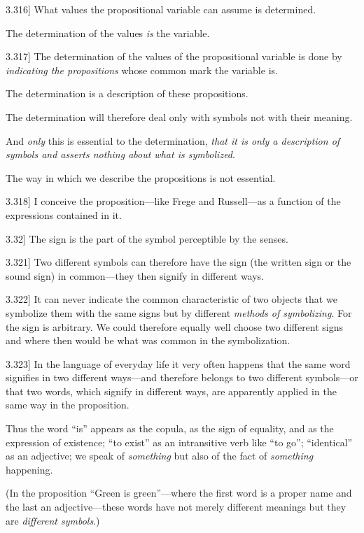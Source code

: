 \documentclass[12pt,oneside]{book}[2007/10/19]
\newcommand{\PropositionE}[2]{%
  \item[\phantomsection\label{PropE:#1}\PropGRef{#1}] #2%
}
\newcommand{\PropGRef}[1]{\hyperref[PropG:#1]{#1}}
\begin{document}
\begin{propositions}
\PropositionE{3.316}
{What values the propositional variable can
assume is determined.

The determination of the values \emph{is} the variable.}


\PropositionE{3.317}
{The determination of the values of the propositional
variable is done by \emph{indicating the propositions}
whose common mark the variable is.

The determination is a description of these
propositions.

The determination will therefore deal only with
symbols not with their meaning.

And \emph{only} this is essential to the determination,
\emph{that it is only a description of symbols and asserts
nothing about what is symbolized}.

The way in which we describe the propositions
is not essential.}


\PropositionE{3.318}
{I conceive the proposition---like Frege and
Russell---as a function of the expressions contained
in it.}


\PropositionE{3.32}
{The sign is the part of the symbol perceptible
by the senses.}


\PropositionE{3.321}
{Two different symbols can therefore have the
sign (the written sign or the sound sign) in
common---they then signify in different ways.}


\PropositionE{3.322}
{It can never indicate the common characteristic
of two objects that we symbolize them with the
same signs but by different \emph{methods of symbolizing}.
For the sign is arbitrary. We could therefore
equally well choose two different signs and
where then would be what was common in the
symbolization.}


\PropositionE{3.323}
{In the language of everyday life it very often
happens that the same word signifies in two different
ways---and therefore belongs to two different
symbols---or that two words, which signify in
different ways, are apparently applied in the same
way in the proposition.

Thus the word ``is'' appears as the copula,
as the sign of equality, and as the expression of
existence; ``to exist'' as an intransitive verb like
``to go''; ``identical'' as an adjective; we speak
of \emph{something} but also of the fact of \emph{something}
happening.

(In the proposition ``Green is green''---where
the first word is a proper name and the last an
adjective---these words have not merely different
meanings but they are \emph{different symbols}.)}



\end{propositions}
\end{document}
